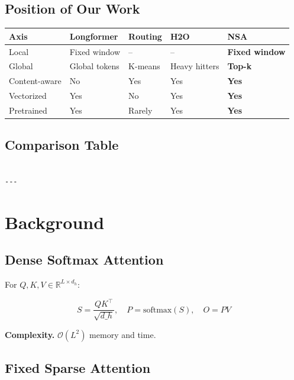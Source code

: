 \subsection{Position of Our Work}

\begin{table}[H]
\centering
\small
\begin{tabular}{lllll}
\toprule
\textbf{Axis} & \textbf{Longformer} & \textbf{Routing} & \textbf{H2O} & \textbf{NSA} \\
\midrule
Local & Fixed window & -- & -- & \textbf{Fixed window} \\
Global & Global tokens & K-means & Heavy hitters & \textbf{Top-k} \\
Content-aware & No & Yes & Yes & \textbf{Yes} \\
Vectorized & Yes & No & Yes & \textbf{Yes} \\
Pretrained & Yes & Rarely & Yes & \textbf{Yes} \\
\bottomrule
\end{tabular}
\end{table}

\subsection{Comparison Table}

\begin{lstlisting}

---
\end{lstlisting}


\section{Background}

\subsection{Dense Softmax Attention}

For $Q, K, V \in \mathbb{R}^{L \times d_h}$:

\[
S = \frac{QK^\top}{\sqrt{d\_h}}, \quad
P = \text{softmax}(S), \quad
O = PV
\tag{3.1}
\]

\textbf{Complexity.} $\mathcal{O}(L^2)$ memory and time.

\subsection{Fixed Sparse Attention}

